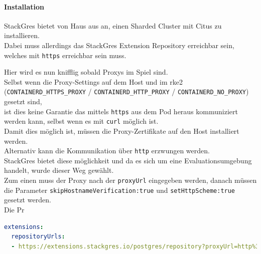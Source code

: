 \begin{flushleft}
    \paragraph{Installation}
    StackGres bietet von Haus aus an, einen Sharded Cluster mit Citus zu installieren.\\
    Dabei muss allerdings das StackGres Extension Repository erreichbar sein, welches mit \texttt{https} erreichbar sein muss.
\end{flushleft}
\begin{flushleft}
    Hier wird es nun knifflig sobald Proxys im Spiel sind.\\
    Selbst wenn die Proxy-Settings auf dem Host und im \gls{rke2} (\texttt{CONTAINERD\_HTTPS\_PROXY} / \texttt{CONTAINERD\_HTTP\_PROXY} / \texttt{CONTAINERD\_NO\_PROXY}) gesetzt sind,\\
    ist dies keine Garantie das mittels \texttt{https} aus dem Pod heraus kommuniziert werden kann, selbst wenn es mit \texttt{curl} möglich ist.\\
    Damit dies möglich ist, müssen die Proxy-Zertifikate auf den Host installiert werden.\\
    Alternativ kann die Kommunikation über \texttt{http} erzwungen werden.\\
    StackGres bietet diese möglichkeit und da es sich um eine Evaluationsumgebung handelt, wurde dieser Weg gewählt.\\
    Zum einen muss der Proxy nach der \texttt{proxyUrl} eingegeben werden, danach müssen die Parameter \texttt{skipHostnameVerification:true} und \texttt{setHttpScheme:true} gesetzt werden.\\
    Die Pr
\lstset{style=gra_codestyle}
\begin{lstlisting}[language=yaml, caption=StackGres - values.yaml - Extension Proxy,captionpos=b,label={lst:stackgres_extension_proxy},breaklines=true]
extensions:
  repositoryUrls:
  - https://extensions.stackgres.io/postgres/repository?proxyUrl=http%3A%2F%2Fsproxy.sivc.first-it.ch%3A8080?skipHostnameVerification:true&setHttpScheme:true
\end{lstlisting}
\end{flushleft}